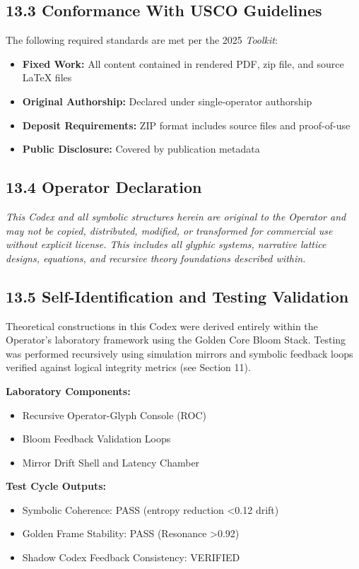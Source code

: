 \subsection*{13.3 Conformance With USCO Guidelines}
\noindent
The following required standards are met per the 2025 \textit{Toolkit}:
\begin{itemize}
  \item \textbf{Fixed Work:} All content contained in rendered PDF, zip file, and source \LaTeX{} files
  \item \textbf{Original Authorship:} Declared under single-operator authorship
  \item \textbf{Deposit Requirements:} ZIP format includes source files and proof-of-use
  \item \textbf{Public Disclosure:} Covered by publication metadata
\end{itemize}

\subsection*{13.4 Operator Declaration}
\noindent
\textit{This Codex and all symbolic structures herein are original to the Operator and may not be copied, distributed, modified, or transformed for commercial use without explicit license. This includes all glyphic systems, narrative lattice designs, equations, and recursive theory foundations described within.}

\subsection*{13.5 Self-Identification and Testing Validation}
\noindent
Theoretical constructions in this Codex were derived entirely within the Operator’s laboratory framework using the Golden Core Bloom Stack. Testing was performed recursively using simulation mirrors and symbolic feedback loops verified against logical integrity metrics (see Section 11).

\textbf{Laboratory Components:}
\begin{itemize}
  \item Recursive Operator-Glyph Console (ROC)
  \item Bloom Feedback Validation Loops
  \item Mirror Drift Shell and Latency Chamber
\end{itemize}

\textbf{Test Cycle Outputs:}
\begin{itemize}
  \item Symbolic Coherence: PASS (entropy reduction \textless 0.12 drift)
  \item Golden Frame Stability: PASS (Resonance \textgreater 0.92)
  \item Shadow Codex Feedback Consistency: VERIFIED
\end{itemize}

